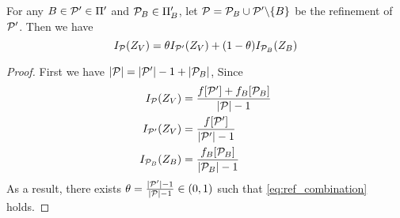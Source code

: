 \begin{lemma}\label{lem:ref_combination}
For any $B \in \P' \in \Pi'$ and $\P_B \in \Pi'_B$, let $\P = \P_B \cup \P' \backslash \{B\} $
be the refinement of $\P'$. Then we have
\begin{equation}\label{eq:ref_combination}
I_{\P}(Z_V) = \theta I_{\P'}(Z_V) + (1-\theta) I_{\P_B}(Z_B)
\end{equation}
\end{lemma}
\begin{proof}
First we have $\abs{\P} = \abs{\P'} -1 + \abs{\P_B}$,
Since
\begin{align*}
I_{\P}(Z_V) & = { f[\P'] + f_B[\P_B] \over \abs{\P} - 1} \\
I_{\P'}(Z_V) & = { f[\P'] \over \abs{\P'} - 1} \\
I_{\P_B}(Z_B) & = { f_B[\P_B] \over \abs{\P_B} - 1}
\end{align*}
As a result, there exists $\theta = {\abs{\P'} - 1 \over \abs{\P} - 1} \in (0,1)$ such that 
\eqref{eq:ref_combination} holds.
\end{proof}


